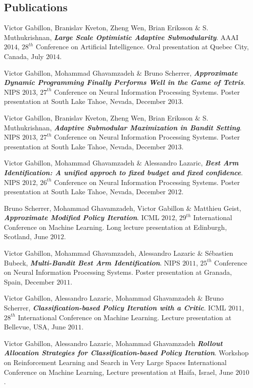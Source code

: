 \subsection{Publications}
 Victor Gabillon, Branislav Kveton, Zheng Wen, Brian Eriksson $\&$ S. Muthukrishnan, \textbf{\emph{Large Scale Optimistic Adaptive Submodularity}}.
AAAI $2014$, $28^{th}$ Conference on Artificial Intelligence.
Oral presentation at Quebec City, Canada, July $2014$.


 Victor Gabillon, Mohammad Ghavamzadeh $\&$ Bruno Scherrer, 
\textbf{\emph{Approximate Dynamic Programming Finally Performs Well in the Game of Tetris}}.
NIPS $2013$, $27^{th}$ Conference on Neural Information Processing Systems.
Poster presentation at South Lake Tahoe, Nevada, December $2013$.


 Victor Gabillon, Branislav Kveton, Zheng Wen, Brian Eriksson $\&$ S. Muthukrishnan, \textbf{\emph{Adaptive Submodular Maximization in Bandit Setting}}.
NIPS $2013$, $27^{th}$ Conference on Neural Information Processing Systems.
Poster presentation at South Lake Tahoe, Nevada, December $2013$.


 Victor Gabillon, Mohammad Ghavamzadeh $\&$  Alessandro Lazaric, \textbf{\emph{Best Arm Identification: A unified approch to fixed budget and fixed confidence}}.
NIPS $2012$, $26^{th}$ Conference on Neural Information Processing Systems.
Poster presentation at South Lake Tahoe, Nevada, December $2012$.


 Bruno Scherrer, Mohammad Ghavamzadeh, Victor Gabillon $\&$ Matthieu Geist, \textbf{\emph{Approximate Modified Policy Iteration}}.
ICML $2012$, $29^{th}$  International Conference on Machine Learning.
Long lecture presentation at Edinburgh, Scotland, June $2012$.


 Victor Gabillon, Mohammad Ghavamzadeh, Alessandro Lazaric $\&$ Sébastien Bubeck, \textbf{\emph{Multi-Bandit Best Arm Identification}}.
NIPS $2011$, $25^{th}$ Conference on Neural Information Processing Systems.
Poster presentation at Granada, Spain, December $2011$.


 Victor Gabillon, Alessandro Lazaric, Mohammad Ghavamzadeh $\&$  Bruno Scherrer, \textbf{ \emph{Classification-based Policy Iteration with a Critic}}. ICML $2011$, $28^{th}$  International Conference on Machine Learning. Lecture presentation at Bellevue, USA, June $2011$.


 Victor Gabillon,  Alessandro Lazaric, Mohammad Ghavamzadeh \textbf{ \emph{Rollout Allocation Strategies for Classification-based Policy Iteration}}. Workshop on Reinforcement Learning and Search in Very Large Spaces International Conference on Machine Learning,  Lecture presentation at Haifa, Israel, June $2010$.


